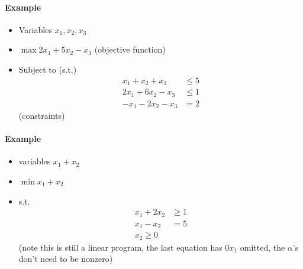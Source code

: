 \documentclass[12 pt]{article}
\begin{document}
        \paragraph{Example}
        \begin{itemize}
        \item Variables $x_1, x_2, x_3$
        \item $\max 2x_1 +5x_2 - x_3$ (objective function)
        \item Subject to (s.t.)
          \begin{align*}
            x_1 + x_2 + x_3 &\leq 5
            \\ 2x_1 + 6x_2 - x_3 &\leq 1
            \\ -x_1 - 2x_2 - x_3 & = 2
          \end{align*}
          (constraints)
        \end{itemize}
        \paragraph{Example}
        \begin{itemize}
        \item variables $x_1 + x_2$
        \item $\min x_1 + x_2$
        \item s.t.
          \begin{align*}
            x_1 + 2x_2 & \geq 1
            \\ x_1 - x_2 & = 5
            \\ x_2 \geq 0
          \end{align*}
          (note this is still a linear program, the last equation has
          $0x_1$ omitted, the $\alpha$'s don't need to be nonzero)
        \end{itemize}
\end{document}
